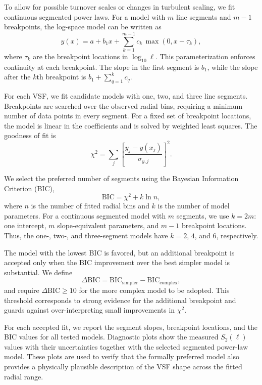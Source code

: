 To allow for possible turnover scales or changes in turbulent scaling, we fit
continuous segmented power laws. For a model with $m$ line segments and
$m-1$ breakpoints, the log-space model can be written as
\begin{equation}
    y(x)
    =
    a
    +
    b_1 x
    +
    \sum_{k=1}^{m-1}
    c_k \, \max(0, x-\tau_k),
    \label{eq:segmented-model}
\end{equation}
where $\tau_k$ are the breakpoint locations in $\log_{10}\ell$. This
parameterization enforces continuity at each breakpoint. The slope in the first
segment is $b_1$, while the slope after the $k$th breakpoint is
$b_1 + \sum_{q=1}^{k} c_q$.

For each VSF, we fit candidate models with one, two, and three line segments.
Breakpoints are searched over the observed radial bins, requiring a minimum
number of data points in every segment. For a fixed set of breakpoint
locations, the model is linear in the coefficients and is solved by weighted
least squares. The goodness of fit is
\begin{equation}
    \chi^2
    =
    \sum_j
    \left[
    \frac{y_j - y(x_j)}{\sigma_{y,j}}
    \right]^2 .
    \label{eq:chi2-vsf}
\end{equation}

We select the preferred number of segments using the Bayesian Information
Criterion (BIC),
\begin{equation}
    \mathrm{BIC}
    =
    \chi^2 + k \ln n,
    \label{eq:bic}
\end{equation}
where $n$ is the number of fitted radial bins and $k$ is the number of model
parameters. For a continuous segmented model with $m$ segments, we use
$k=2m$: one intercept, $m$ slope-equivalent parameters, and $m-1$ breakpoint
locations. Thus, the one-, two-, and three-segment models have
$k=2$, $4$, and $6$, respectively.

The model with the lowest BIC is favored, but an additional breakpoint is
accepted only when the BIC improvement over the best simpler model is
substantial. We define
\begin{equation}
    \Delta \mathrm{BIC}
    =
    \mathrm{BIC}_{\mathrm{simpler}}
    -
    \mathrm{BIC}_{\mathrm{complex}},
    \label{eq:delta-bic}
\end{equation}
and require $\Delta \mathrm{BIC} \geq 10$ for the more complex model to be
adopted. This threshold corresponds to strong evidence for the additional
breakpoint and guards against over-interpreting small improvements in
$\chi^2$.

For each accepted fit, we report the segment slopes, breakpoint locations, and
the BIC values for all tested models. Diagnostic plots show the measured
$S_2(\ell)$ values with their uncertainties together with the selected
segmented power-law model. These plots are used to verify that the formally
preferred model also provides a physically plausible description of the VSF
shape across the fitted radial range.
